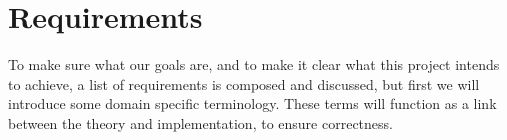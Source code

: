 \chapter{Requirements} \label{ch:Requirements}
To make sure what our goals are, and to make it clear what this project intends to achieve, a list of requirements is composed and discussed, but first we will introduce some domain specific terminology. These terms will function as a link between the theory and implementation, to ensure correctness.


